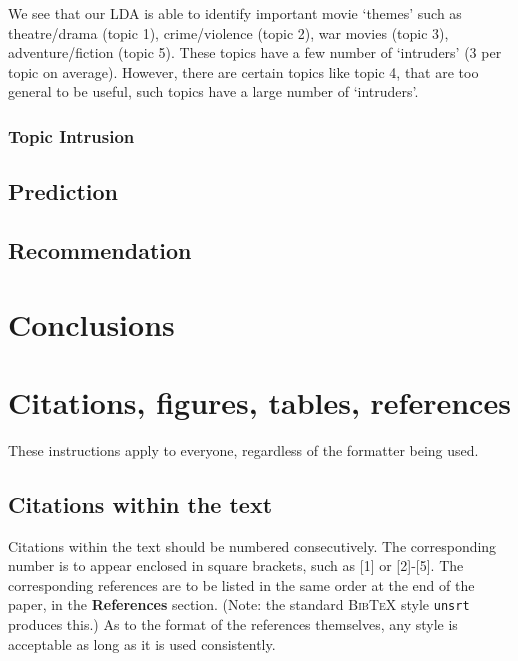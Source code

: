 \documentclass{article} %
\begin{document}
We see that our LDA is able to identify important movie `themes' such as 
theatre/drama (topic 1), crime/violence (topic 2), war movies (topic 3), 
adventure/fiction (topic 5). These topics have a few number of `intruders' (3 
per topic on average). However, there are certain topics like topic 4, that are 
too general to be useful, such topics have a large number of `intruders'.

\subsubsection{Topic Intrusion}



\subsection{Prediction}


\subsection{Recommendation}









\section{Conclusions}


\section{Citations, figures, tables, references}
\label{others}

These instructions apply to everyone, regardless of the formatter being used.

\subsection{Citations within the text}

Citations within the text should be numbered consecutively. The corresponding
number is to appear enclosed in square brackets, such as [1] or [2]-[5]. The
corresponding references are to be listed in the same order at the end of the
paper, in the \textbf{References} section. (Note: the standard
\textsc{Bib\TeX} style \texttt{unsrt} produces this.) As to the format of the
references themselves, any style is acceptable as long as it is used
consistently.
\end{document}
